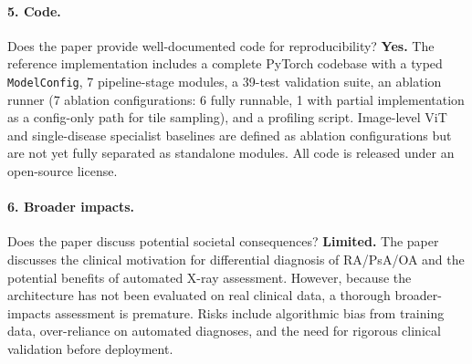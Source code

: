\documentclass{article}
\begin{document}
\paragraph{5. Code.}
Does the paper provide well-documented code for reproducibility?
\textbf{Yes.} The reference implementation includes a complete PyTorch codebase with a typed \texttt{ModelConfig}, 7 pipeline-stage modules, a 39-test validation suite, an ablation runner (7 ablation configurations: 6 fully runnable, 1 with partial implementation as a config-only path for tile sampling), and a profiling script. Image-level ViT and single-disease specialist baselines are defined as ablation configurations but are not yet fully separated as standalone modules. All code is released under an open-source license.

\paragraph{6. Broader impacts.}
Does the paper discuss potential societal consequences?
\textbf{Limited.} The paper discusses the clinical motivation for differential diagnosis of RA/PsA/OA and the potential benefits of automated X-ray assessment. However, because the architecture has not been evaluated on real clinical data, a thorough broader-impacts assessment is premature. Risks include algorithmic bias from training data, over-reliance on automated diagnoses, and the need for rigorous clinical validation before deployment.
\end{document}
